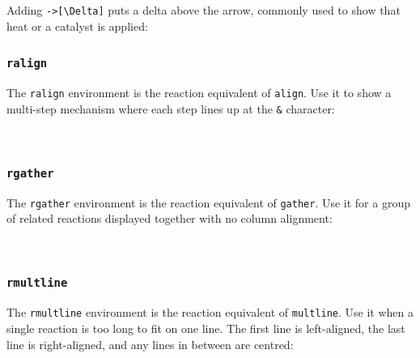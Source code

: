 		\begin{requation}
			\label{rxn:combustion}
		\end{requation}
		
		\begin{requation}
			\ce{A + B <=> C + D}
			\label{rxn:equilibrium}
		\end{requation}
		
		Adding \texttt{->[\textbackslash Delta]} puts a delta above the arrow, commonly used to show that heat or a catalyst is applied:
		
		\begin{requation}
			\ce{A ->[\Delta] B}
		\end{requation}
		
		\begin{requation}
			\ce{A ->[\Delta][Heat] B}
			\label{rxn:heat}
		\end{requation}
		
		\subsubsection{\texttt{ralign}}
		The \texttt{ralign} environment is the reaction equivalent of \texttt{align}. Use it to show a multi-step mechanism where each step lines up at the \texttt{\&} character:
		
		\begin{ralign}
			 \notag \\
			\label{rxn:mechanism}
		\end{ralign}
		
		\subsubsection{\texttt{rgather}}
		The \texttt{rgather} environment is the reaction equivalent of \texttt{gather}. Use it for a group of related reactions displayed together with no column alignment:
		
		\begin{rgather}
			 \notag \\
			\label{rxn:gather}
		\end{rgather}
		
		\subsubsection{\texttt{rmultline}}
		The \texttt{rmultline} environment is the reaction equivalent of \texttt{multline}. Use it when a single reaction is too long to fit on one line. The first line is left-aligned, the last line is right-aligned, and any lines in between are centred:
		
